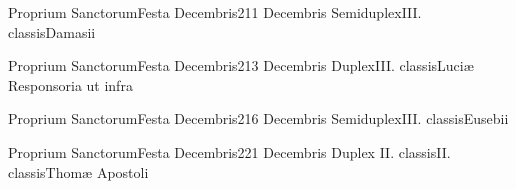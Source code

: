 \documentclass[liber-responsorialis-hiemalis.tex]{subfiles}
\begin{document}

	{Proprium Sanctorum}{Festa Decembris}{2}{11 Decembris}
	{Semiduplex}{III. classis}{Damasii}
	{\coporubric}
	{\respdetemp}


	{Proprium Sanctorum}{Festa Decembris}{2}{13 Decembris}
	{Duplex}{III. classis}{Luciæ}
	{Responsoria ut infra}
	{\respdetemp}
\rubric{\respdetemp}

	{Proprium Sanctorum}{Festa Decembris}{2}{16 Decembris}
	{Semiduplex}{III. classis}{Eusebii}
	{\umexrubric}
	{\respdetemp}

	{Proprium Sanctorum}{Festa Decembris}{2}{21 Decembris}
	{Duplex II. classis}{II. classis}{Thomæ Apostoli}
	{}
	{}
\rubric{\apexrubric}
	
\end{document}
